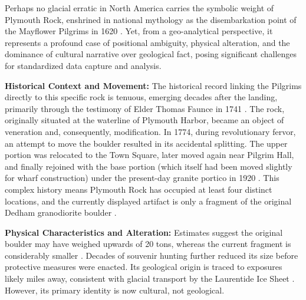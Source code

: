 \documentclass[
11pt, %
english, %
singlespacing, %
headsepline, %
]{MastersDoctoralThesis} %
\begin{document}
Perhaps no glacial erratic in North America carries the symbolic weight of Plymouth Rock, enshrined in national mythology as the disembarkation point of the Mayflower Pilgrims in 1620 \cite{Seelye1997}. Yet, from a geo-analytical perspective, it represents a profound case of positional ambiguity, physical alteration, and the dominance of cultural narrative over geological fact, posing significant challenges for standardized data capture and analysis.

\textbf{Historical Context and Movement:} The historical record linking the Pilgrims directly to this specific rock is tenuous, emerging decades after the landing, primarily through the testimony of Elder Thomas Faunce in 1741 \cite{Seelye1997}. The rock, originally situated at the waterline of Plymouth Harbor, became an object of veneration and, consequently, modification. In 1774, during revolutionary fervor, an attempt to move the boulder resulted in its accidental splitting. The upper portion was relocated to the Town Square, later moved again near Pilgrim Hall, and finally rejoined with the base portion (which itself had been moved slightly for wharf construction) under the present-day granite portico in 1920 \cite{Seelye1997}. This complex history means Plymouth Rock has occupied at least four distinct locations, and the currently displayed artifact is only a fragment of the original Dedham granodiorite boulder \cite{Emerson1917}.

\textbf{Physical Characteristics and Alteration:} Estimates suggest the original boulder may have weighed upwards of 20 tons, whereas the current fragment is considerably smaller \cite{Emerson1917}. Decades of souvenir hunting further reduced its size before protective measures were enacted. Its geological origin is traced to exposures likely miles away, consistent with glacial transport by the Laurentide Ice Sheet \cite{Emerson1917}. However, its primary identity is now cultural, not geological.
\end{document}
